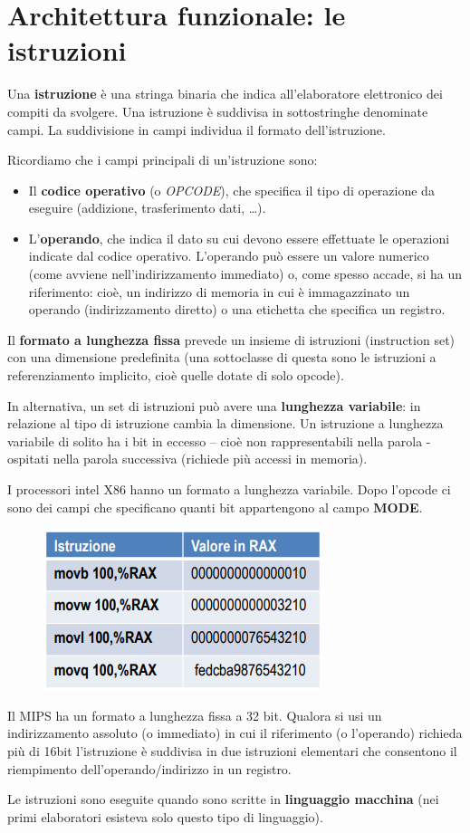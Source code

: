 \documentclass[12pt]{article} %
\begin{document}
\section{Architettura funzionale: le istruzioni}
Una \textbf{istruzione} è una stringa binaria che indica all’elaboratore elettronico dei compiti da svolgere.
Una istruzione è suddivisa in sottostringhe denominate campi. La suddivisione in campi individua il formato dell’istruzione.\par\medskip\noindent
Ricordiamo che i campi principali di un'istruzione sono: 
\begin{itemize}
    \item Il \textbf{codice operativo} (o \textit{OPCODE}), che specifica il tipo di operazione da eseguire (addizione, trasferimento dati, …).
    \item L’\textbf{operando}, che indica il dato su cui devono essere effettuate le operazioni indicate dal codice operativo. L’operando può essere un valore numerico (come avviene nell’indirizzamento immediato) o, come spesso accade, si ha un riferimento: cioè, un indirizzo di memoria in cui è immagazzinato un operando (indirizzamento diretto) o una etichetta che specifica un registro.
\end{itemize}
\par\medskip\noindent
Il \textbf{formato a lunghezza fissa} prevede un insieme di istruzioni (instruction set) con una dimensione predefinita (una sottoclasse di questa sono le istruzioni a referenziamento implicito, cioè quelle dotate di solo opcode). \par\medskip\noindent
In alternativa, un set di istruzioni può avere una \textbf{lunghezza variabile}: in relazione al tipo di istruzione cambia la dimensione. Un istruzione a lunghezza variabile di solito ha i bit in eccesso – cioè non rappresentabili nella parola - ospitati nella parola successiva (richiede più accessi in memoria).\par\medskip\noindent
I processori intel X86 hanno un formato a lunghezza variabile. Dopo l’opcode ci sono dei campi che specificano quanti bit appartengono al campo \textbf{MODE}.
\begin{figure}[h]
    \centering
    \includegraphics[width=0.5\linewidth]{image.png}
    \label{fig:enter-label}
\end{figure}
\par\medskip\noindent
Il MIPS ha un formato a lunghezza fissa a 32 bit.
Qualora si usi un indirizzamento assoluto (o immediato) in cui il riferimento (o l’operando) richieda più di 16bit l’istruzione è suddivisa in due istruzioni elementari che consentono il riempimento dell’operando/indirizzo in un registro.
\par\medskip\noindent
Le istruzioni sono eseguite quando sono scritte in \textbf{linguaggio macchina} (nei primi elaboratori esisteva solo questo tipo di linguaggio). 
\end{document}
